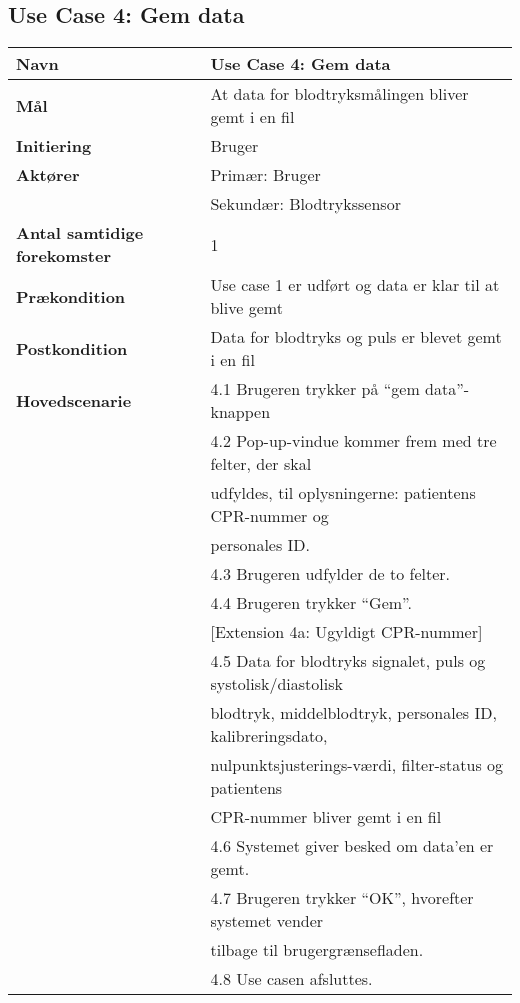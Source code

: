 \subsection{Use Case 4: Gem data}
\vspace{0.8 cm}
\begin{table}[h!]
	\begin{tabular}{l|l}
		\rowcolor[HTML]{A9D9F9} 
		\textbf{Navn} & Use Case 4: Gem data \\
		\hline
		\textbf{Mål} & At data for blodtryksmålingen bliver gemt i en fil \\
		\hline
		\rowcolor[HTML]{A9D9F9} 
		\textbf{Initiering} & Bruger \\
		\hline
		\textbf{Aktører} & Primær: Bruger \\
		\textbf{} & Sekundær: Blodtrykssensor \\
		\hline
		\rowcolor[HTML]{A9D9F9} 
		\textbf{Antal samtidige forekomster} & 1 \\
		\hline
		\textbf{Prækondition} & Use case 1 er udført og data er klar til at blive gemt \\
		\hline
		\rowcolor[HTML]{A9D9F9} 
		\textbf{Postkondition} & Data for blodtryks og puls er blevet gemt i en fil \\
		\hline
		\textbf{Hovedscenarie} & 4.1 Brugeren trykker på “gem data”-knappen \\
		& 4.2 Pop-up-vindue kommer frem med tre felter, der skal \\
		& udfyldes, til oplysningerne: patientens CPR-nummer og \\
		& personales ID. \\
		& 4.3 Brugeren udfylder de to felter. \\
		& 4.4 Brugeren trykker “Gem”. \\
		& {[}Extension 4a: Ugyldigt CPR-nummer{]} \\
		& 4.5 Data for blodtryks signalet, puls og systolisk/diastolisk \\
		& blodtryk, middelblodtryk, personales ID, kalibreringsdato, \\
		& nulpunktsjusterings-værdi, filter-status og patientens \\
		& CPR-nummer bliver gemt i en fil \\
		& 4.6 Systemet giver besked om data’en er gemt. \\
		& 4.7 Brugeren trykker “OK”, hvorefter systemet vender \\
		& tilbage til brugergrænsefladen. \\
		& 4.8 Use casen afsluttes. \\

\end{tabular}
\end{table}
